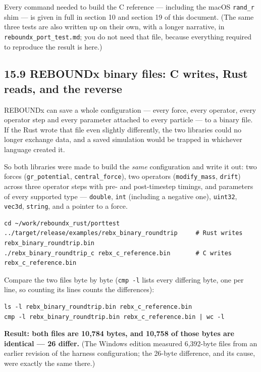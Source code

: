 \documentclass[11pt]{article}
\begin{document}
Every command needed to build the C reference --- including the macOS \texttt{rand\_r} shim --- is given in full in section 10 and section 19 of this document. (The same three tests are also written up on their own, with a longer narrative, in \texttt{reboundx\_port\_test.md}; you do not need that file, because everything required to reproduce the result is here.)

\subsection{15.9 REBOUNDx binary files: C writes, Rust reads, and the reverse}

REBOUNDx can save a whole configuration --- every force, every operator, every operator step and every parameter attached to every particle --- to a binary file. If the Rust wrote that file even slightly differently, the two libraries could no longer exchange data, and a saved simulation would be trapped in whichever language created it.

So both libraries were made to build the \emph{same} configuration and write it out: two forces (\texttt{gr\_potential}, \texttt{central\_force}), two operators (\texttt{modify\_mass}, \texttt{drift}) across three operator steps with pre- and post-timestep timings, and parameters of every supported type --- \texttt{double}, \texttt{int} (including a negative one), \texttt{uint32}, \texttt{vec3d}, \texttt{string}, and a pointer to a force.

\begin{lstlisting}
cd ~/work/reboundx_rust/porttest
../target/release/examples/rebx_binary_roundtrip     # Rust writes rebx_binary_roundtrip.bin
./rebx_binary_roundtrip_c rebx_c_reference.bin       # C writes rebx_c_reference.bin
\end{lstlisting}

Compare the two files byte by byte (\texttt{cmp -l} lists every differing byte, one per line, so counting its lines counts the differences):

\begin{lstlisting}
ls -l rebx_binary_roundtrip.bin rebx_c_reference.bin
cmp -l rebx_binary_roundtrip.bin rebx_c_reference.bin | wc -l
\end{lstlisting}

\textbf{Result: both files are 10,784 bytes, and 10,758 of those bytes are identical --- 26 differ.} (The Windows edition measured 6,392-byte files from an earlier revision of the harness configuration; the 26-byte difference, and its cause, were exactly the same there.)
\end{document}
